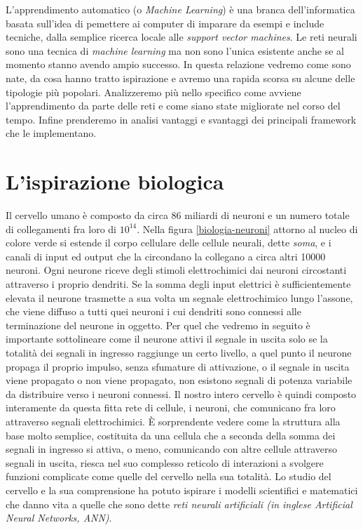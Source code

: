 L'apprendimento automatico (o \textit{Machine Learning}) è una branca dell'informatica basata sull'idea di pemettere ai computer di imparare da esempi e include tecniche, dalla semplice ricerca locale alle \textit{support vector machines}. 
 Le reti neurali sono una tecnica di \emph{machine learning} ma non sono l'unica esistente anche se al momento stanno avendo ampio successo. In questa relazione vedremo come sono nate, da cosa hanno tratto ispirazione e avremo una rapida scorsa su alcune delle tipologie più popolari. Analizzeremo più nello specifico come avviene l'apprendimento da parte delle reti e come siano state migliorate nel corso del tempo. Infine prenderemo in analisi vantaggi e svantaggi dei principali framework che le implementano.

\section{L'ispirazione biologica}
Il cervello umano è composto da circa 86 miliardi di neuroni e un numero totale di collegamenti fra loro di $10^{14}$. Nella figura \ref{biologia-neuroni} attorno al nucleo di colore verde si estende il corpo cellulare delle cellule neurali, dette \textit{soma}, e i canali di input ed output che la circondano la collegano a circa altri 10000 neuroni.
Ogni neurone riceve degli stimoli elettrochimici dai neuroni circostanti attraverso i proprio dendriti. Se la somma degli input elettrici è sufficientemente elevata il neurone trasmette a sua volta un segnale elettrochimico lungo l'assone, che viene diffuso a tutti quei neuroni i cui dendriti sono connessi alle terminazione del neurone in oggetto.
Per quel che vedremo in seguito è importante sottolineare come il neurone attivi il segnale in uscita solo se la totalità dei segnali in ingresso raggiunge un certo livello, a quel punto il neurone propaga il proprio impulso, senza sfumature di attivazione, o il segnale in uscita viene propagato o non viene propagato, non esistono segnali di potenza variabile da distribuire verso i neuroni connessi.
Il nostro intero cervello è quindi composto interamente da questa fitta rete di cellule, i neuroni, che comunicano fra loro attraverso segnali elettrochimici. \`E sorprendente vedere come la struttura alla base molto semplice, costituita da una cellula che a seconda della somma dei segnali in ingresso si attiva, o meno, comunicando con altre cellule attraverso segnali in uscita, riesca nel suo complesso reticolo di interazioni a svolgere funzioni complicate come quelle del cervello nella sua totalità.
Lo studio del cervello e la sua comprensione ha potuto ispirare i modelli scientifici e matematici che danno vita a quelle che sono dette \textit{reti neurali artificiali (in inglese \textit{Artificial Neural Networks}, ANN)}.
\clearpage

